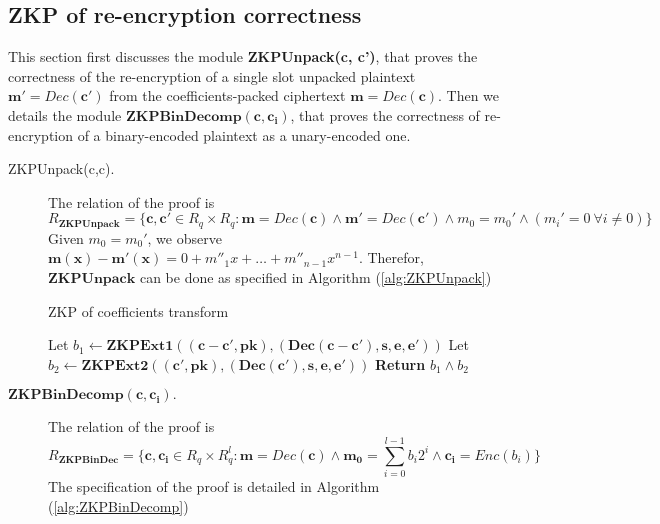 \subsection{ZKP of re-encryption correctness}
\label{sec:ZKPReencrypt}
This section first discusses the module \textbf{ZKPUnpack(c, c')}, that proves the
correctness of the re-encryption of a single slot unpacked plaintext $\mathbf{m'} = Dec(\mathbf{c'})$ from the
coefficients-packed ciphertext $\mathbf{m} = Dec(\mathbf{c})$.
Then we details the module $\mathbf{ZKPBinDecomp(c,c_i)}$, that proves the correctness of re-encryption of a binary-encoded plaintext as a unary-encoded one.
\begin{description}
\item [{ZKPUnpack(c,c).}]The relation of the proof is
  \[
    R_{\mathbf{ZKPUnpack}} = \{ \mathbf{c, c'} \in R_q \times R_q :
    \mathbf{m} = Dec(\mathbf{c}) \land \mathbf{m'} = Dec(\mathbf{c'}) \land m_0
    = m_0' \land (m_i' = 0 \  \forall i \neq 0)\}
  \]
  Given $m_0 = m_0'$, we observe $\mathbf{m(x) - m'(x)} = 0 + m''_1x + \dots + m''_{n-1}x^{n-1}$. Therefor, $\mathbf{ZKPUnpack}$
  can be done as specified in Algorithm (\ref{alg:ZKPUnpack})

  \begin{algorithm}
    \caption{ZKP of coefficients transform}\label{alg:ZKPUnpack}
    \begin{algorithmic}[1]
      \State Let $b_1 \gets \mathbf{ZKPExt1((c-c',pk),(Dec(c-c'), s, e, e'))}$
      \State Let $b_2 \gets \mathbf{ZKPExt2((c',pk),(Dec(c'),s,e,e'))}$
      \State \textbf{Return} $b_1 \land b_2$
      \EndProcedure
    \end{algorithmic}
  \end{algorithm}

\item [$\mathbf{ZKPBinDecomp(c,c_i).}$] The relation of the proof is
  \[
    R_{\mathbf{ZKPBinDec}} = \{ \mathbf{c,c_i} \in R_q \times R_q^l:
    \mathbf{m} = Dec(\mathbf{c}) \land \mathbf{m_0} = \sum_{i=0}^{l-1}b_i2^i
    \land \mathbf{c_i} = Enc(b_i)
    \}
  \]
  The specification of the proof is detailed in Algorithm
  (\ref{alg:ZKPBinDecomp})


\end{description}
